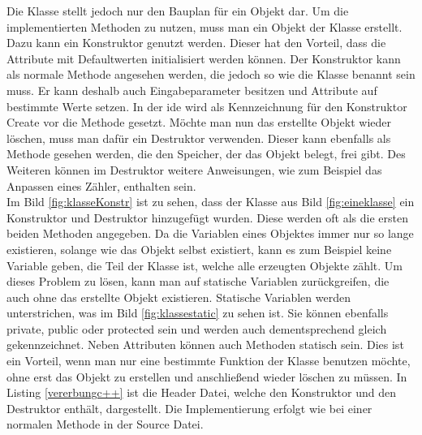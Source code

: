 Die Klasse stellt jedoch nur den Bauplan für ein Objekt dar. Um die implementierten Methoden zu nutzen, muss man ein Objekt der Klasse erstellt. Dazu kann ein \glqq Konstruktor\grqq{} genutzt werden. Dieser hat den Vorteil, dass die Attribute mit Defaultwerten initialisiert werden können. Der \glqq Konstruktor\grqq{} kann als normale Methode angesehen werden, die jedoch so wie die Klasse benannt sein muss. Er kann deshalb auch Eingabeparameter besitzen und Attribute auf bestimmte Werte setzen. In der \ac{ide} wird als Kennzeichnung für den Konstruktor \glqq Create\grqq{} vor die Methode gesetzt. Möchte man nun das erstellte Objekt wieder löschen, muss man dafür ein  \glqq Destruktor\grqq{} verwenden. Dieser kann ebenfalls als Methode gesehen werden, die den Speicher, der das Objekt belegt, frei gibt. Des Weiteren können im  \glqq Destruktor\grqq{} weitere Anweisungen, wie zum Beispiel das Anpassen eines Zähler, enthalten sein.\\
 Im Bild \ref{fig:klasseKonstr} ist zu sehen, dass der Klasse aus Bild \ref{fig:eineklasse} ein \glqq Konstruktor\grqq{} und \glqq Destruktor\grqq{} hinzugefügt wurden. Diese werden oft als die ersten beiden Methoden angegeben.
  Da die Variablen eines Objektes immer nur so lange existieren, solange wie das Objekt selbst existiert, kann es zum Beispiel keine Variable geben, die Teil der Klasse ist, welche alle erzeugten Objekte zählt. Um dieses Problem zu lösen, kann man auf statische Variablen  zurückgreifen, die auch ohne das erstellte Objekt existieren. Statische Variablen werden unterstrichen, was im Bild \ref{fig:klassestatic} zu sehen ist. Sie können ebenfalls   \glqq private\grqq{}, \glqq public\grqq{} oder  \glqq protected\grqq{} sein und werden auch dementsprechend gleich gekennzeichnet. Neben Attributen können auch Methoden statisch sein. Dies ist ein Vorteil, wenn man nur eine bestimmte Funktion der Klasse benutzen möchte, ohne erst das Objekt zu erstellen und anschließend wieder löschen zu müssen. In Listing \ref{vererbungc++} ist die Header Datei, welche den Konstruktor und den Destruktor enthält, dargestellt. Die Implementierung erfolgt wie bei einer normalen Methode in der Source Datei. 
